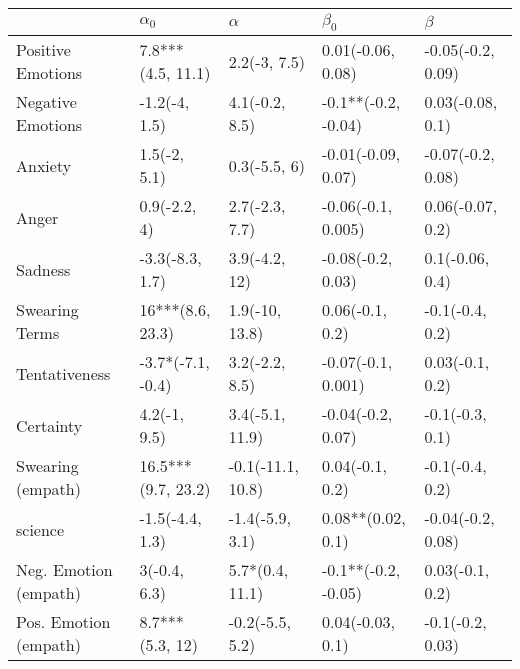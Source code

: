\begin{tabular}{lllll}
\toprule
{} &          $\alpha_0$ &           $\alpha$ &            $\beta_0$ &            $\beta$ \\
\midrule
Positive Emotions     &   7.8***(4.5, 11.1) &       2.2(-3, 7.5) &    0.01(-0.06, 0.08) &  -0.05(-0.2, 0.09) \\
Negative Emotions     &       -1.2(-4, 1.5) &     4.1(-0.2, 8.5) &  -0.1**(-0.2, -0.04) &   0.03(-0.08, 0.1) \\
Anxiety               &        1.5(-2, 5.1) &       0.3(-5.5, 6) &   -0.01(-0.09, 0.07) &  -0.07(-0.2, 0.08) \\
Anger                 &        0.9(-2.2, 4) &     2.7(-2.3, 7.7) &   -0.06(-0.1, 0.005) &   0.06(-0.07, 0.2) \\
Sadness               &     -3.3(-8.3, 1.7) &      3.9(-4.2, 12) &    -0.08(-0.2, 0.03) &    0.1(-0.06, 0.4) \\
Swearing Terms        &    16***(8.6, 23.3) &     1.9(-10, 13.8) &      0.06(-0.1, 0.2) &    -0.1(-0.4, 0.2) \\
Tentativeness         &   -3.7*(-7.1, -0.4) &     3.2(-2.2, 8.5) &   -0.07(-0.1, 0.001) &    0.03(-0.1, 0.2) \\
Certainty             &        4.2(-1, 9.5) &    3.4(-5.1, 11.9) &    -0.04(-0.2, 0.07) &    -0.1(-0.3, 0.1) \\
Swearing (empath)     &  16.5***(9.7, 23.2) &  -0.1(-11.1, 10.8) &      0.04(-0.1, 0.2) &    -0.1(-0.4, 0.2) \\
science               &     -1.5(-4.4, 1.3) &    -1.4(-5.9, 3.1) &    0.08**(0.02, 0.1) &  -0.04(-0.2, 0.08) \\
Neg. Emotion (empath) &        3(-0.4, 6.3) &    5.7*(0.4, 11.1) &  -0.1**(-0.2, -0.05) &    0.03(-0.1, 0.2) \\
Pos. Emotion (empath) &     8.7***(5.3, 12) &    -0.2(-5.5, 5.2) &     0.04(-0.03, 0.1) &   -0.1(-0.2, 0.03) \\
\bottomrule
\end{tabular}
